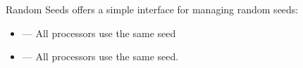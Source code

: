 \begin{frame}
  \begin{block}{Random Seeds}\pause
   offers a simple interface for managing random seeds:
    \begin{itemize}
      \item {} --- All processors use 
the same seed 
      \item {} --- All processors use 
the same seed.
    \end{itemize}
  \end{block}
\end{frame}



% 
% 
%   
% 
% 
% 




